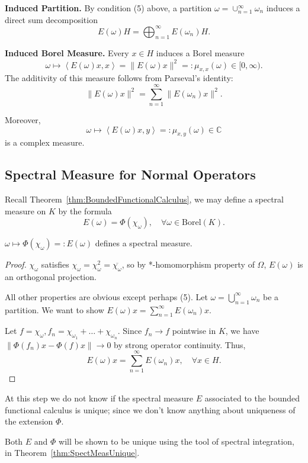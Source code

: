 \textbf{Induced Partition.}
By condition (5) above, a partition $\omega = \cup_{n = 1}^\infty  \omega_n$ induces a direct sum decomposition
\[
	E(\omega) H = \bigoplus_{n = 1} ^\infty  E(\omega_n) H
.\] 

\textbf{Induced Borel Measure.} 
Every $x \in H$ induces a Borel measure
\[
	\omega \mapsto \left\langle E(\omega) x, x \right\rangle 
	= \|E(\omega) x\|^2 =: \mu_{x, x}(\omega) \in [0,\infty )
.\] 
The additivity of this measure follows from Parseval's identity:
\[
	\|E(\omega) x\|^2 = \sum_{n=1}^{\infty} \|E(\omega_n) x\|^2
.\] 

Moreover,
\[
	\omega \mapsto \left\langle E(\omega) x, y \right\rangle 
	=: \mu_{x, y}(\omega) \in \mathbb{C}
\] 
is a complex measure.

\subsection{Spectral Measure for Normal Operators}

Recall Theorem~\ref{thm:BoundedFunctionalCalculus}, we may define a spectral measure on $K$ by the formula
\[
	E(\omega) = \Phi(\chi_\omega), \quad \forall \omega \in \text{Borel}(K)
.\] 

\begin{proposition}
	\label{prop:SpectralMeasureFunctional}
	$\omega \mapsto \Phi(\chi_\omega) =:E(\omega)$ defines a spectral measure.
\end{proposition}
\begin{proof}
	$\chi_\omega$ satisfies $\chi_\omega = \chi_\omega^2 = \overline{\chi_\omega} $, so by *-homomorphism property of $\Omega$, $E(\omega)$ is an orthogonal projection.

	All other properties are obvious except perhaps (5). Let $\omega = \bigcup_{n = 1} ^\infty  \omega_n$ be a partition. We want to show $E\left( \omega \right) x = \sum_{n = 1}^\infty  E(\omega_n) x$. 

	Let $f = \chi_\omega, f_n = \chi_{\omega_1} + \ldots + \chi_{\omega_n}$. Since $f_n \to f$ pointwise in $K$, we have $\|\Phi(f_n) x  - \Phi(f) x\| \to 0$ by strong operator continuity. Thus,
	\[
		E(\omega) x = \sum_{n=1}^{\infty} E(\omega_n) x, \quad \forall  x \in H
	.\] 
\end{proof}

\begin{remark}
	At this step we do not know if the spectral measure $E$ associated to the bounded functional calculus is unique; since we don't know anything about uniqueness of the extension $\Phi$.

	Both $E$ and $\Phi$ will be shown to be unique using the tool of spectral integration, in Theorem~\ref{thm:SpectMeasUnique}.
\end{remark}

